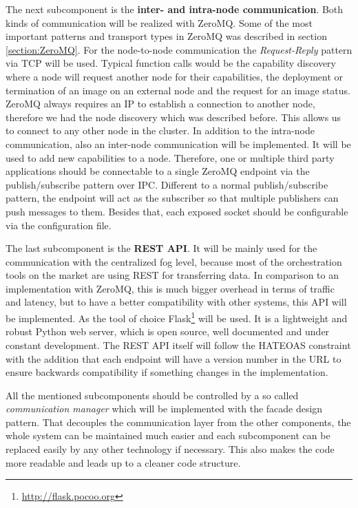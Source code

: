 The next subcomponent is the \textbf{inter- and intra-node communication}.
Both kinds of communication will be realized with ZeroMQ.
Some of the most important patterns and transport types in ZeroMQ was described in section \ref{section:ZeroMQ}.
For the node-to-node communication the \textit{Request-Reply} pattern via \ac{TCP} will be used.
Typical function calls would be the capability discovery where a node will request another node for their capabilities, the deployment or termination of an image on an external node and the request for an image status.
ZeroMQ always requires an \ac{IP} to establish a connection to another node, therefore we had the node discovery which was described before.
This allows us to connect to any other node in the cluster.
In addition to the intra-node communication, also an inter-node communication will be implemented.
It will be used to add new capabilities to a node.
Therefore, one or multiple third party applications should be connectable to a single ZeroMQ endpoint via the publish/subscribe pattern over \ac{IPC}.
Different to a normal publish/subscribe pattern, the endpoint will act as the subscriber so that multiple publishers can push messages to them.
Besides that, each exposed socket should be configurable via the configuration file.

The last subcomponent is the \textbf{\ac{REST} \ac{API}}.
It will be mainly used for the communication with the centralized fog level, because most of the orchestration tools on the market are using \ac{REST} for transferring data.
In comparison to an implementation with ZeroMQ, this is much bigger overhead in terms of traffic and latency, but to have a better compatibility with other systems, this \ac{API} will be implemented.
As the tool of choice Flask\footnote{\url{http://flask.pocoo.org}} will be used.
It is a lightweight and robust Python web server, which is open source, well documented and under constant development.
The \ac{REST} \ac{API} itself will follow the \ac{HATEOAS} constraint with the addition that each endpoint will have a version number in the \ac{URL} to ensure backwards compatibility if something changes in the implementation.

All the mentioned subcomponents should be controlled by a so called \textit{communication manager} which will be implemented with the facade design pattern.
That decouples the communication layer from the other components, the whole system can be maintained much easier and each subcomponent can be replaced easily by any other technology if necessary.
This also makes the code more readable and leads up to a cleaner code structure.


